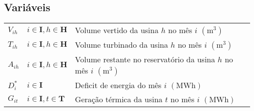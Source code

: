 \documentclass[12pt]{article}
\begin{document}
\subsection*{Variáveis}
\begin{tabularx}{\linewidth}{llX}
	$V_{ih}$ & $i \in \textbf{I},h \in \textbf{H}$ & Volume vertido da usina $h$ no mês $i$ $(\textrm{m}^{3})$                  \\
	$T_{ih}$ & $i \in \textbf{I},h \in \textbf{H}$ & Volume turbinado da usina $h$ no mês $i$ $(\textrm{m}^{3})$                \\
	$A_{ih}$ & $i \in \textbf{I},h \in \textbf{H}$ & Volume restante no reservatório da usina $h$ no mês $i$ $(\textrm{m}^{3})$ \\
	$D^*_i$  & $i \in \textbf{I}$                  & Deficit de energia do mês $i$ $(\textrm{MWh})$                             \\
	$G_{it}$ & $i \in \textbf{I},t \in \textbf{T}$ & Geração térmica da usina $t$ no mês $i$ $(\textrm{MWh})$
\end{tabularx}

\newcommand{\fob}{\multicolumn{5}{l}
{$
\displaystyle\sum_{i \in \textbf{I}} \textbf{M} D^*_i +
\displaystyle\sum_{i \in \textbf{I} \atop h \in \textbf{H}} (\textbf{M} V_{ih} + \ell_{ih}) +
\displaystyle\sum_{i \in \textbf{I} \atop t \in \textbf{T}} \gamma_t G_{it}
$}}
\end{document}
